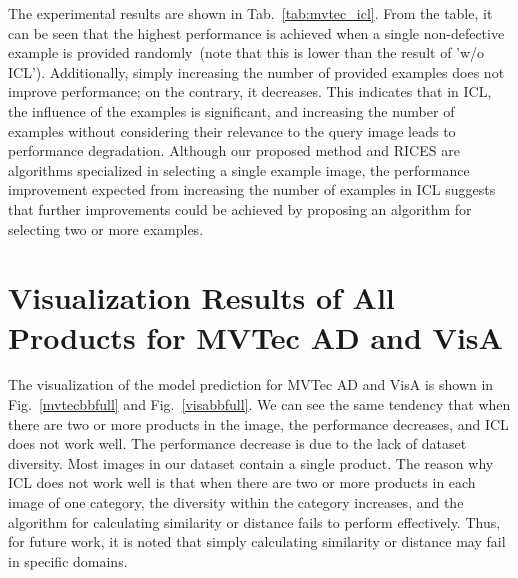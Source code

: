 The experimental results are shown in Tab.~\ref{tab:mvtec_icl}.
% 
From the table, it can be seen that the highest performance is achieved when a single non-defective example is provided randomly~(note that this is lower than the result of 'w/o ICL').
% 
Additionally, simply increasing the number of provided examples does not improve performance; on the contrary, it decreases.
% 
This indicates that in ICL, the influence of the examples is significant, and increasing the number of examples without considering their relevance to the query image leads to performance degradation.
% 
Although our proposed method and RICES are algorithms specialized in selecting a single example image, the performance improvement expected from increasing the number of examples in ICL suggests that further improvements could be achieved by proposing an algorithm for selecting two or more examples.


\section{Visualization Results of All Products for MVTec AD and VisA}
The visualization of the model prediction for MVTec AD and VisA is shown in Fig.~\ref{mvtecbbfull} and Fig.~\ref{visabbfull}.
% 
We can see the same tendency that when there are two or more products in the image, the performance decreases, and ICL does not work well.
% 
The performance decrease is due to the lack of dataset diversity. Most images in our dataset contain a single product.
% 
The reason why ICL does not work well is that when there are two or more products in each image of one category, the diversity within the category increases, and the algorithm for calculating similarity or distance fails to perform effectively.
% 
Thus, for future work, it is noted that simply calculating similarity or distance may fail in specific domains.


\mvtecbbfull
\visabbfull
